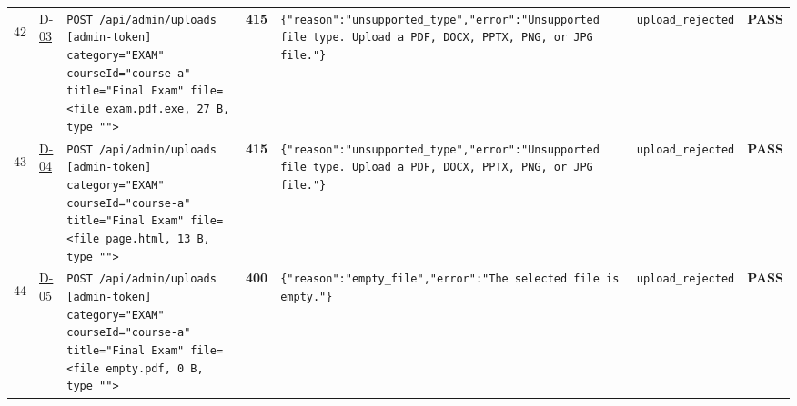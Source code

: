 \documentclass[10pt,a4paper]{article}
\begin{document}
\begin{landscape}
\begin{longtable}{@{}P{0.6cm}P{0.9cm}P{8.5cm}P{1.0cm}P{6.2cm}P{4.2cm}P{1.1cm}@{}}
\hypertarget{call42}{42} & \hyperlink{test-D-03}{D-03} & \texttt{POST /\allowbreak{}api/\allowbreak{}admin/\allowbreak{}uploads [admin-\allowbreak{}token] category=\allowbreak{}"\allowbreak{}EXAM"\allowbreak{} courseId=\allowbreak{}"\allowbreak{}course-\allowbreak{}a"\allowbreak{} title=\allowbreak{}"\allowbreak{}Final Exam"\allowbreak{} file=\allowbreak{}<file exam.\allowbreak{}pdf.\allowbreak{}exe,\allowbreak{} 27 B,\allowbreak{} type "\allowbreak{}"\allowbreak{}>} & \textcolor{warnamber}{\textbf{415}} & \texttt{\{"\allowbreak{}reason"\allowbreak{}:\allowbreak{}"\allowbreak{}unsupported\_\allowbreak{}type"\allowbreak{},\allowbreak{}"\allowbreak{}error"\allowbreak{}:\allowbreak{}"\allowbreak{}Unsupported file type.\allowbreak{} Upload a PDF,\allowbreak{} DOCX,\allowbreak{} PPTX,\allowbreak{} PNG,\allowbreak{} or JPG file.\allowbreak{}"\allowbreak{}\}} & \texttt{upload\_\allowbreak{}rejected} & \textcolor{passgreen}{\textbf{PASS}} \\
\hypertarget{call43}{43} & \hyperlink{test-D-04}{D-04} & \texttt{POST /\allowbreak{}api/\allowbreak{}admin/\allowbreak{}uploads [admin-\allowbreak{}token] category=\allowbreak{}"\allowbreak{}EXAM"\allowbreak{} courseId=\allowbreak{}"\allowbreak{}course-\allowbreak{}a"\allowbreak{} title=\allowbreak{}"\allowbreak{}Final Exam"\allowbreak{} file=\allowbreak{}<file page.\allowbreak{}html,\allowbreak{} 13 B,\allowbreak{} type "\allowbreak{}"\allowbreak{}>} & \textcolor{warnamber}{\textbf{415}} & \texttt{\{"\allowbreak{}reason"\allowbreak{}:\allowbreak{}"\allowbreak{}unsupported\_\allowbreak{}type"\allowbreak{},\allowbreak{}"\allowbreak{}error"\allowbreak{}:\allowbreak{}"\allowbreak{}Unsupported file type.\allowbreak{} Upload a PDF,\allowbreak{} DOCX,\allowbreak{} PPTX,\allowbreak{} PNG,\allowbreak{} or JPG file.\allowbreak{}"\allowbreak{}\}} & \texttt{upload\_\allowbreak{}rejected} & \textcolor{passgreen}{\textbf{PASS}} \\
\hypertarget{call44}{44} & \hyperlink{test-D-05}{D-05} & \texttt{POST /\allowbreak{}api/\allowbreak{}admin/\allowbreak{}uploads [admin-\allowbreak{}token] category=\allowbreak{}"\allowbreak{}EXAM"\allowbreak{} courseId=\allowbreak{}"\allowbreak{}course-\allowbreak{}a"\allowbreak{} title=\allowbreak{}"\allowbreak{}Final Exam"\allowbreak{} file=\allowbreak{}<file empty.\allowbreak{}pdf,\allowbreak{} 0 B,\allowbreak{} type "\allowbreak{}"\allowbreak{}>} & \textcolor{warnamber}{\textbf{400}} & \texttt{\{"\allowbreak{}reason"\allowbreak{}:\allowbreak{}"\allowbreak{}empty\_\allowbreak{}file"\allowbreak{},\allowbreak{}"\allowbreak{}error"\allowbreak{}:\allowbreak{}"\allowbreak{}The selected file is empty.\allowbreak{}"\allowbreak{}\}} & \texttt{upload\_\allowbreak{}rejected} & \textcolor{passgreen}{\textbf{PASS}} \\

\end{longtable}
\end{landscape}
\end{document}

